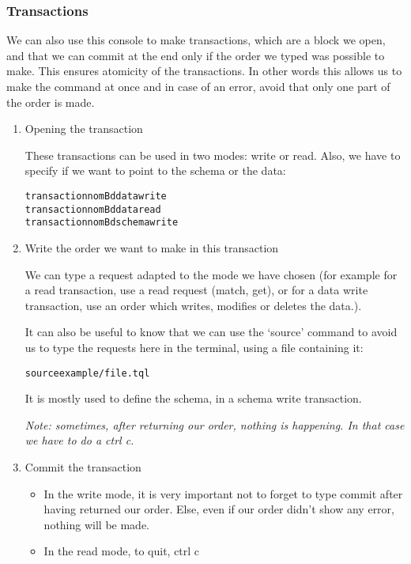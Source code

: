\documentclass{article}
\begin{document}
  \subsubsection{Transactions}
We can also use this console to make transactions, which are a block we open, and that we can commit at the end only if the order we typed was possible to make. This ensures atomicity of the transactions. In other words this allows us to make the command at once and in case of an error, avoid that only one part of the order is made.

\begin{enumerate}
\item Opening  the transaction

These transactions can be used in two modes: write or read. Also, we have to specify if we want to point to the schema or the data:

\begin{alltt}
transaction nomBd data write
transaction nomBd data read
transaction nomBd schema write
\end{alltt}       

\item Write the order we want to make in this transaction

We can type a request adapted to the mode we have chosen (for example for a read transaction, use a read request (match, get), or for a data write transaction, use an order which writes, modifies or deletes the data.).

It can also be useful to know that we can use the ‘source’ command to avoid us to type the requests here in the terminal, using a file containing it: 
\begin{alltt}source example/file.tql \end{alltt}
It is mostly used to define the schema, in a schema write transaction.

\emph{Note: sometimes, after returning our order, nothing is happening. In that case we have to do a ctrl c.}

\item Commit the transaction
\begin{itemize}
\item In the write mode, it is very important not to forget to type commit after having returned our order. Else, even if our order didn’t show any error, nothing will be made.
\item In the read mode, to quit, ctrl c
\end{itemize}

\end{enumerate}
\end{document}
